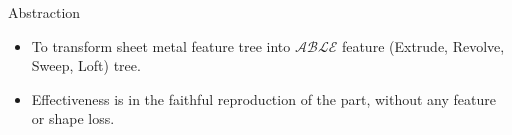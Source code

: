 \begin{frame}{Abstraction}

\begin{itemize}[noitemsep,label=\textbullet,topsep=2pt,parsep=2pt,partopsep=2pt]
\item To transform sheet metal feature tree into  $\mathcal{ABLE}$ feature (Extrude, Revolve, Sweep, Loft) tree. 
\item Effectiveness is in the faithful reproduction of the part, without any feature or shape loss.
\end{itemize}


\def\myfigenlosuredefeaturecolumnwidth{0.95}
\def\myfigenlosureabelcolumnwidth{0.98}
\begin{tabular}[h]{@{} p{0.12\linewidth}  p{0.38\linewidth} p{0.15\linewidth} p{0.2\linewidth}@{}} \midrule


\end{tabular}
\end{frame}
